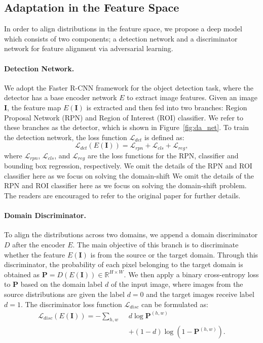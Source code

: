 \documentclass[10pt,twocolumn,letterpaper]{article}
\begin{document}
\subsection{Adaptation in the Feature Space}
In order to align distributions in the feature space, we propose a deep model which consists of two components; a detection network and a discriminator network for feature alignment via adversarial learning.
\vspace{-2mm}\paragraph{Detection Network.} We adopt the Faster R-CNN \cite{Ren_2017} framework for the object detection task, where the detector has a base encoder network $E$ to extract image features.
Given an image $\mathbf{I}$, the feature map $E(\mathbf{I})$ is extracted and then fed into two branches: Region Proposal Network (RPN) and Region of Interest (ROI) classifier. We refer to these branches as the detector, which is shown in Figure~\ref{fig:da_net}.
To train the detection network, the loss function $\mathcal{L}_{det}$ is defined as:
\begin{equation} \label{eq:det_loss}
\mathcal{L}_{det}(E(\mathbf{I})) = \mathcal{L}_{rpn} + \mathcal{L}_{cls} + \mathcal{L}_{reg},
\end{equation}
where $\mathcal{L}_{rpn}$, $\mathcal{L}_{cls}$, and $\mathcal{L}_{reg}$ are the loss functions for the RPN, classifier and bounding box regression, respectively.
We omit the details of the RPN and ROI classifier here as we focus on solving the domain-shift We omit the details of the RPN and ROI classifier here as we focus on solving the domain-shift problem. The readers are encouraged to refer to the original paper \cite{Ren_2017} for further details.

\vspace{-2mm}\paragraph{Domain Discriminator.}
To align the distributions across two domains, we append a domain discriminator $D$ after the encoder $E$.
The main objective of this branch is to discriminate whether the feature $E(\mathbf{I})$ is from the source or the target domain.
Through this discriminator, the probability of each pixel belonging to the target domain is obtained as $\mathbf{P} = D(E(\mathbf{I})) \in \mathbb{R}^{H \times W}$.
We then apply a binary cross-entropy loss to $\mathbf{P}$ based on the domain label $d$ of the input image,
where images from the source distributions are given the label $d = 0$ and the target images receive label $d = 1$.
The discriminator loss function $\mathcal{L}_{disc}$ can be formulated as:
\begin{align}
\mathcal{L}_{disc}(E(\mathbf{I})) = - \sum_{h,w} \ \ &d \log \mathbf{P}^{(h,w)} \nonumber \\
&+ (1-d)  \log (1 - \mathbf{P}^{(h,w)}).
 \label{eq:obj}
\end{align}
\end{document}
